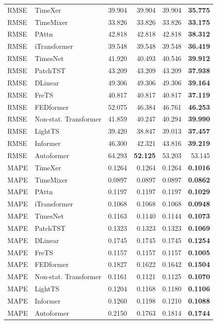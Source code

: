 \begin{longtable}{llrrrr}
\midrule
RMSE & TimeXer & 39.904 & 39.904 & 39.904 & \textbf{35.775} \\
RMSE & TimeMixer & 33.826 & 33.826 & 33.826 & \textbf{33.175} \\
RMSE & PAttn & 42.818 & 42.818 & 42.818 & \textbf{38.312} \\
RMSE & iTransformer & 39.548 & 39.548 & 39.548 & \textbf{36.419} \\
RMSE & TimesNet & 41.920 & 40.493 & 40.546 & \textbf{39.912} \\
RMSE & PatchTST & 43.209 & 43.209 & 43.209 & \textbf{37.938} \\
RMSE & DLinear & 49.306 & 49.306 & 49.306 & \textbf{39.164} \\
RMSE & FreTS & 40.817 & 40.817 & 40.817 & \textbf{37.119} \\
RMSE & FEDformer & 52.075 & 46.384 & 46.761 & \textbf{46.253} \\
RMSE & Non-stat. Transformer & 41.859 & 40.247 & 40.294 & \textbf{39.990} \\
RMSE & LightTS & 39.420 & 38.847 & 39.013 & \textbf{37.457} \\
RMSE & Informer & 46.300 & 42.321 & 43.816 & \textbf{39.219} \\
RMSE & Autoformer & 64.293 & \textbf{52.125} & 53.203 & 53.145 \\
\midrule
MAPE & TimeXer & 0.1264 & 0.1264 & 0.1264 & \textbf{0.1016} \\
MAPE & TimeMixer & 0.0897 & 0.0897 & 0.0897 & \textbf{0.0862} \\
MAPE & PAttn & 0.1197 & 0.1197 & 0.1197 & \textbf{0.1029} \\
MAPE & iTransformer & 0.1068 & 0.1068 & 0.1068 & \textbf{0.0948} \\
MAPE & TimesNet & 0.1163 & 0.1140 & 0.1144 & \textbf{0.1073} \\
MAPE & PatchTST & 0.1323 & 0.1323 & 0.1323 & \textbf{0.1069} \\
MAPE & DLinear & 0.1745 & 0.1745 & 0.1745 & \textbf{0.1254} \\
MAPE & FreTS & 0.1157 & 0.1157 & 0.1157 & \textbf{0.1005} \\
MAPE & FEDformer & 0.1827 & 0.1622 & 0.1642 & \textbf{0.1504} \\
MAPE & Non-stat. Transformer & 0.1161 & 0.1121 & 0.1125 & \textbf{0.1070} \\
MAPE & LightTS & 0.1204 & 0.1168 & 0.1180 & \textbf{0.1106} \\
MAPE & Informer & 0.1260 & 0.1198 & 0.1210 & \textbf{0.1088} \\
MAPE & Autoformer & 0.2150 & 0.1763 & 0.1814 & \textbf{0.1744} \\
\end{longtable}
\endgroup

